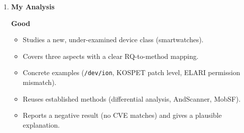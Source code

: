 \documentclass[11pt,a4paper]{article}
\newcommand{\entrypart}[1]{\textbf{\color{accent}#1}\par\vspace{2pt}}
\begin{document}
\begin{enumerate}
    \vspace{4pt}
    \textbf{Limitations (authors)}
    \begin{itemize}[leftmargin=*,itemsep=1pt,topsep=2pt]
        \item Limited and uneven firmware collection; some vendors give few images or none; this can cause mistakes in differential analysis.
        \item Static analysis cannot determine exact device node operations; only same-name comparison; Google's smartwatch system does not cover all Android versions, so phone images are used for missing versions.
        \item MobSF results may contain false positives.
    \end{itemize}

    \item \entrypart{My Analysis}

    \textbf{Good}
    \begin{itemize}[leftmargin=*,itemsep=1pt,topsep=2pt]
        \item Studies a new, under-examined device class (smartwatches).
        \item Covers three aspects with a clear RQ-to-method mapping.
        \item Concrete examples (\texttt{/dev/ion}, KOSPET patch level, ELARI permission mismatch).
        \item Reuses established methods (differential analysis, AndScanner, MobSF).
        \item Reports a negative result (no CVE matches) and gives a plausible explanation.
    \end{itemize}


\end{enumerate}
\end{document}
